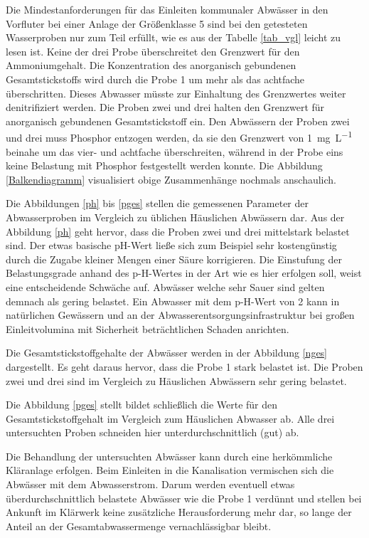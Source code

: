 Die Mindestanforderungen für das Einleiten kommunaler Abwässer in den Vorfluter bei einer Anlage der Größenklasse 5 sind bei den getesteten Wasserproben nur zum Teil erfüllt, wie es aus der Tabelle \ref{tab_vgl} leicht zu lesen ist. Keine der drei Probe überschreitet den Grenzwert für den Ammoniumgehalt. Die Konzentration des anorganisch gebundenen Gesamtstickstoffs wird durch die Probe 1 um mehr als das achtfache überschritten. Dieses Abwasser müsste zur Einhaltung des Grenzwertes weiter denitrifiziert werden. Die Proben zwei und drei halten den Grenzwert für anorganisch gebundenen Gesamtstickstoff ein. Den Abwässern der Proben zwei und drei muss Phosphor entzogen werden, da sie den Grenzwert von \SI{1}{\milli\gram\per\liter} beinahe um das vier- und achtfache überschreiten, während in der Probe eins keine Belastung mit Phosphor festgestellt werden konnte.
Die Abbildung \ref{Balkendiagramm} visualisiert obige Zusammenhänge nochmals anschaulich.


Die Abbildungen \ref{ph} bis \ref{pges} stellen die gemessenen Parameter der Abwasserproben im Vergleich zu üblichen Häuslichen Abwässern dar. Aus der Abbildung \ref{ph} geht hervor, dass die Proben zwei und drei mittelstark belastet sind. Der etwas basische pH-Wert ließe sich zum Beispiel sehr kostengünstig durch die Zugabe kleiner Mengen einer Säure korrigieren. Die Einstufung der Belastungsgrade anhand des p-H-Wertes in der Art wie es hier erfolgen soll, weist eine entscheidende Schwäche auf. Abwässer welche sehr Sauer sind gelten demnach als gering belastet. Ein Abwasser mit dem p-H-Wert von 2 kann in natürlichen Gewässern und an der Abwasserentsorgungsinfrastruktur bei großen Einleitvolumina mit Sicherheit beträchtlichen Schaden anrichten. 

Die Gesamtstickstoffgehalte der Abwässer werden in der Abbildung \ref{nges} dargestellt. Es geht daraus hervor, dass die Probe 1 stark belastet ist. Die Proben zwei und drei sind im Vergleich zu Häuslichen Abwässern sehr gering belastet.

Die Abbildung \ref{pges} stellt bildet schließlich die Werte für den Gesamtstickstoffgehalt im Vergleich zum Häuslichen Abwasser ab. Alle drei untersuchten Proben schneiden hier unterdurchschnittlich (gut) ab.

Die Behandlung der untersuchten Abwässer kann durch eine herkömmliche Kläranlage erfolgen. Beim Einleiten in die Kanalisation vermischen sich die Abwässer mit dem Abwasserstrom. Darum werden eventuell etwas überdurchschnittlich belastete Abwässer wie die Probe 1 verdünnt und stellen bei Ankunft im Klärwerk keine zusätzliche Herausforderung mehr dar, so lange der Anteil an der Gesamtabwassermenge vernachlässigbar bleibt.

